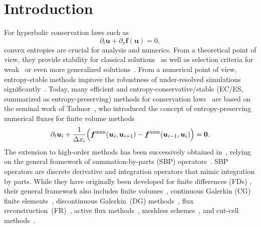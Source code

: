 \documentclass[]{scrartcl}
\renewcommand{\vec}[1]{\boldsymbol{#1}}
\theoremstyle{definition}
\begin{document}
\section{Introduction}
For hyperbolic conservation laws such as
\begin{equation}
	\partial_t \vec{u} + \partial_x \vec{f}(\vec{u}) = 0,
	\label{conservation_law}
\end{equation}
convex entropies are crucial for analysis and numerics.
From a theoretical point of view, they provide stability for classical solutions~\cite[Section~V]{dafermos2016hyperbolic} as well as selection criteria for weak~\cite[Sections~VIII and IX]{dafermos2016hyperbolic} or even more generalized solutions~\cite{feireisl2021numerical}.
From a numerical point of view, entropy-stable methods improve the robustness of under-resolved simulations significantly~\cite{gassner2016split,Chan2022OnTE,sjogreen2018high,rojas2021robustness,badrkhani2025entropy,aiello2026impact}.
Today, many efficient and entropy-conservative/stable (EC/ES, summarized as entropy-preserving) methods for conservation laws~\cite{ranocha2023efficient,winters2018comparative} are based on the seminal work of Tadmor~\cite{Tadmor1987,Tadmor2003}, who introduced the concept of entropy-preserving numerical fluxes for finite volume methods
\begin{equation}
	\partial_t \vec{u}_i
    + \frac{1}{\Delta x_i} \Bigl (
        \vec{f}^{\mathrm{num}}( \vec{u}_{i}, \vec{u}_{i+1} )
        - \vec{f}^{\mathrm{num}}( \vec{u}_{i-1}, \vec{u}_{i} )
    \Bigr ) = \vec{0}.
	\label{FV_conservation}
\end{equation}
The extension to high-order methods has been successively obtained in~\cite{LeFloch2006,FISHER2013518,chen2017entropy,Ranocha2018,chan2018discretely,chan2019skew}, relying on the general framework of summation-by-parts (SBP) operators~\cite{svard2014review,fernandez2014review}.
SBP operators are discrete derivative and integration operators that mimic integration by parts.
While they have originally been developed for finite differences (FDs)
\cite{kreiss1974finite,strand1994summation,carpenter1994time},
their general framework also includes finite volumes~\cite{nordstrom2001finite},
continuous Galerkin (CG) finite elements~\cite{Hicken2016_SBP,hicken2020entropy,abgrall2020analysisI},
discontinuous Galerkin~(DG) methods~\cite{gassner2013skew,carpenter2014entropy},
flux reconstruction~(FR)~\cite{huynh2007flux,vincent2011newclass,ranocha2016summation},
active flux methods~\cite{eymann2011active,barsukow2025stability},
meshless schemes~\cite{hicken2025constructing,kwan2025robust},
and cut-cell methods~\cite{petri2026kinetic,taylor2025entropy}.
\end{document}
